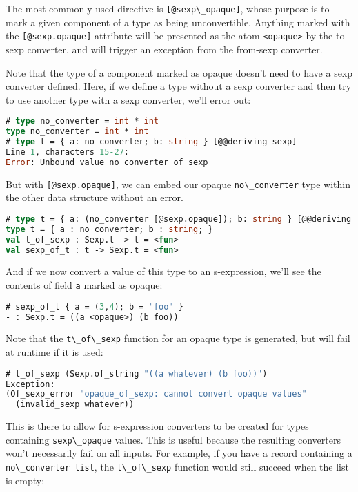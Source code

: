The most commonly used directive is
\passthrough{\lstinline![@sexp\_opaque]!}, whose purpose is to mark a
given component of a type as being unconvertible. Anything marked with
the \passthrough{\lstinline![@sexp.opaque]!} attribute will be presented
as the atom \passthrough{\lstinline!<opaque>!} by the to-sexp converter,
and will trigger an exception from the from-sexp converter.

Note that the type of a component marked as opaque doesn't need to have
a sexp converter defined. Here, if we define a type without a sexp
converter and then try to use another type with a sexp converter, we'll
error out:

\begin{lstlisting}[language=Caml]
# type no_converter = int * int
type no_converter = int * int
# type t = { a: no_converter; b: string } [@@deriving sexp]
Line 1, characters 15-27:
Error: Unbound value no_converter_of_sexp
\end{lstlisting}

But with \passthrough{\lstinline![@sexp.opaque]!}, we can embed our
opaque \passthrough{\lstinline!no\_converter!} type within the other
data structure without an error.

\begin{lstlisting}[language=Caml]
# type t = { a: (no_converter [@sexp.opaque]); b: string } [@@deriving sexp]
type t = { a : no_converter; b : string; }
val t_of_sexp : Sexp.t -> t = <fun>
val sexp_of_t : t -> Sexp.t = <fun>
\end{lstlisting}

And if we now convert a value of this type to an s-expression, we'll see
the contents of field \passthrough{\lstinline!a!} marked as opaque:

\begin{lstlisting}[language=Caml]
# sexp_of_t { a = (3,4); b = "foo" }
- : Sexp.t = ((a <opaque>) (b foo))
\end{lstlisting}

Note that the \passthrough{\lstinline!t\_of\_sexp!} function for an
opaque type is generated, but will fail at runtime if it is used:

\begin{lstlisting}[language=Caml]
# t_of_sexp (Sexp.of_string "((a whatever) (b foo))")
Exception:
(Of_sexp_error "opaque_of_sexp: cannot convert opaque values"
  (invalid_sexp whatever))
\end{lstlisting}

This is there to allow for s-expression converters to be created for
types containing \passthrough{\lstinline!sexp\_opaque!} values. This is
useful because the resulting converters won't necessarily fail on all
inputs. For example, if you have a record containing a
\passthrough{\lstinline!no\_converter list!}, the
\passthrough{\lstinline!t\_of\_sexp!} function would still succeed when
the list is empty:

